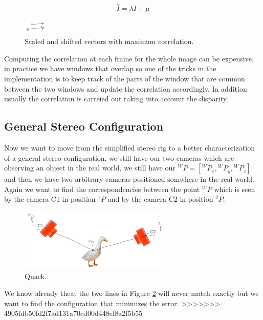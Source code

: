 \begin{multicols}{2}
\[
\hat{I} = \lambda I + \mu
\]
\begin{figure}[H]
    \centering
    \includegraphics[width=0.1\textwidth]{Figures/vectors.png}
    \caption{Scaled and shifted vectors with maximum correlation.}
    \label{fig:vectors}
\end{figure}
\end{multicols}

Computing the correlation at each frame for the whole image
can be expensive, in practice we have windows that overlap so one of the tricks in the implementation is to keep track of the parts of the window that are common between the two windows and update the correlation accordingly. In addition usually the correlation is carreied out taking into account the disparity.

\subsection{General Stereo Configuration}

Now we want to move from the simplified stereo rig to a better characterization of a general stereo configuration, we still have our two cameras which are observing an object in the real world, we still have our \({}^WP=[{}^WP_x, {}^WP_y,{}^WP_z]\) and then we have two arbitrary cameras positioned somwhere in the real world. Again we want to find the correspondencies between the point \({}^WP\) which is seen by the camera C1 in position \({}^1P\) and by the camera C2 in position \({}^2P\).

\begin{figure}[H]
    \centering
    \includegraphics[width=0.65\textwidth]{Figures/duck.png}
    \caption{Quack.}
    \label{fig:duck}
\end{figure}

We know already theat the two lines in Figure \ref{fig:duck} will never match exactly but we want to find the configuration that minimizes the error.
>>>>>>> 4905fdb50fd2f7ad131a70cd00d448cf8a2f5b55
